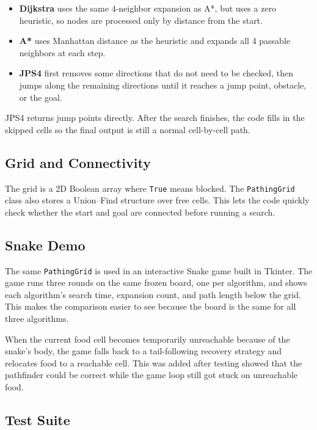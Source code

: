\documentclass[11pt,a4paper]{article}
\begin{document}
\begin{itemize}[nosep]
  \item \textbf{Dijkstra} uses the same 4-neighbor expansion as A*, but uses a zero heuristic, so nodes are processed only by distance from the start.
  \item \textbf{A*} uses Manhattan distance as the heuristic and expands all 4 passable neighbors at each step.
  \item \textbf{JPS4} first removes some directions that do not need to be checked, then jumps along the remaining directions until it reaches a jump point, obstacle, or the goal.
\end{itemize}

JPS4 returns jump points directly. After the search finishes, the code fills in the skipped cells so the final output is still a normal cell-by-cell path.

\subsection{Grid and Connectivity}

The grid is a 2D Boolean array where \texttt{True} means blocked. The \texttt{PathingGrid} class also stores a Union--Find structure over free cells. This lets the code quickly check whether the start and goal are connected before running a search.

\subsection{Snake Demo}

The same \texttt{PathingGrid} is used in an interactive Snake game built in Tkinter. The game runs three rounds on the same frozen board, one per algorithm, and shows each algorithm's search time, expansion count, and path length below the grid. This makes the comparison easier to see because the board is the same for all three algorithms.

When the current food cell becomes temporarily unreachable because of the snake's body, the game falls back to a tail-following recovery strategy and relocates food to a reachable cell. This was added after testing showed that the pathfinder could be correct while the game loop still got stuck on unreachable food.

\subsection{Test Suite}
\end{document}
